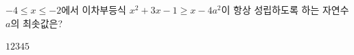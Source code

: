 \hspace*{2mm}\begin{minipage}[t]{\dimexpr\linewidth-2mm\relax}\vspace{0pt}
$-4\le x\le -2$에서 이차부등식 $x^2+3x-1\ge x-4a^2$이 항상 성립하도록 하는 자연수 $a$의 최솟값은?
\begin{choices32}{$1$}{$2$}{$3$}{$4$}{$5$}\end{choices32}\end{minipage}
